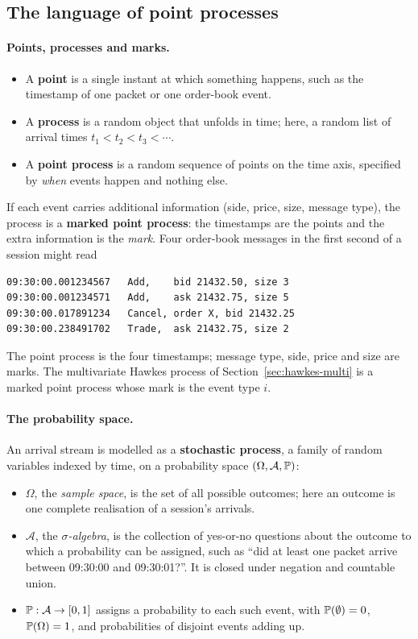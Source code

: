 \subsection{The language of point processes}
\label{sec:pp-language}

\paragraph{Points, processes and marks.}
\begin{itemize}[leftmargin=1.5em,itemsep=1pt]
\item A \textbf{point} is a single instant at which something happens, such as the timestamp of one
  packet or one order-book event.
\item A \textbf{process} is a random object that unfolds in time; here, a random list of arrival
  times $t_1 < t_2 < t_3 < \cdots$.
\item A \textbf{point process} is a random sequence of points on the time axis, specified by
  \emph{when} events happen and nothing else.
\end{itemize}
If each event carries additional information (side, price, size, message type), the process is a
\textbf{marked point process}: the timestamps are the points and the extra information is the
\emph{mark}. Four order-book messages in the first second of a session might read
\begin{verbatim}
09:30:00.001234567   Add,    bid 21432.50, size 3
09:30:00.001234571   Add,    ask 21432.75, size 5
09:30:00.017891234   Cancel, order X, bid 21432.25
09:30:00.238491702   Trade,  ask 21432.75, size 2
\end{verbatim}
The point process is the four timestamps; message type, side, price and size are marks. The
multivariate Hawkes process of Section~\ref{sec:hawkes-multi} is a marked point process whose mark is the
event type $i$.

\paragraph{The probability space.} An arrival stream is modelled as a \textbf{stochastic process}, a family of random variables indexed
by time, on a probability space $(\Omega, \mathcal{A}, \P)$:
\begin{itemize}[leftmargin=1.5em,itemsep=1pt]
\item $\Omega$, the \emph{sample space}, is the set of all possible outcomes; here an outcome is one
  complete realisation of a session's arrivals.
\item $\mathcal{A}$, the \emph{$\sigma$-algebra}, is the collection of yes-or-no questions about the
  outcome to which a probability can be assigned, such as ``did at least one packet arrive between
  09:30:00 and 09:30:01?''. It is closed under negation and countable union.
\item $\P : \mathcal{A} \to [0, 1]$ assigns a probability to each such event, with
  $\P(\emptyset) = 0$, $\P(\Omega) = 1$, and probabilities of disjoint events adding up.
\end{itemize}

